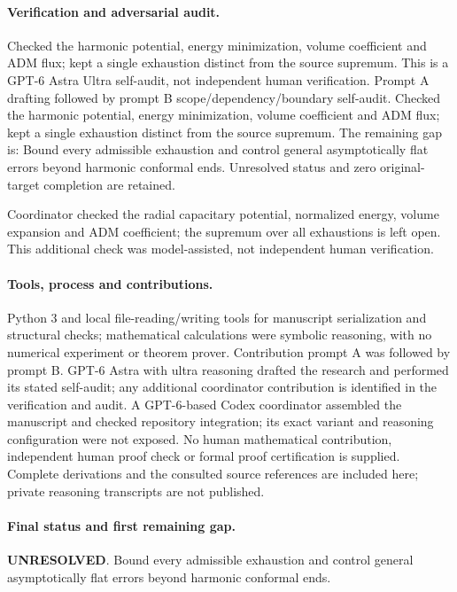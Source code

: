 \documentclass[11pt]{article}
\begin{document}
\paragraph{Verification and adversarial audit.}
Checked the harmonic potential, energy minimization, volume coefficient and ADM flux; kept a single exhaustion distinct from the source supremum. This is a GPT-6 Astra Ultra self-audit, not independent human verification. Prompt A drafting followed by prompt B scope/dependency/boundary self-audit. Checked the harmonic potential, energy minimization, volume coefficient and ADM flux; kept a single exhaustion distinct from the source supremum. The remaining gap is: Bound every admissible exhaustion and control general asymptotically flat errors beyond harmonic conformal ends. Unresolved status and zero original-target completion are retained.

Coordinator checked the radial capacitary potential, normalized energy, volume expansion and ADM coefficient; the supremum over all exhaustions is left open. This additional check was model-assisted, not independent human verification.

\paragraph{Tools, process and contributions.}
Python 3 and local file-reading/writing tools for manuscript serialization and structural checks; mathematical calculations were symbolic reasoning, with no numerical experiment or theorem prover. Contribution prompt A was followed by prompt B. GPT-6 Astra with ultra reasoning drafted the research and performed its stated self-audit; any additional coordinator contribution is identified in the verification and audit. A GPT-6-based Codex coordinator assembled the manuscript and checked repository integration; its exact variant and reasoning configuration were not exposed. No human mathematical contribution, independent human proof check or formal proof certification is supplied. Complete derivations and the consulted source references are included here; private reasoning transcripts are not published.

\paragraph{Final status and first remaining gap.}
\textbf{UNRESOLVED}. Bound every admissible exhaustion and control general asymptotically flat errors beyond harmonic conformal ends.
\end{document}
